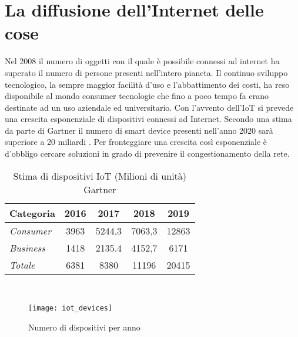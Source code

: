 \section{La diffusione dell'Internet delle cose}
Nel 2008 il numero di oggetti con il quale è possibile
connessi ad internet ha superato il numero di persone presenti nell'intero
pianeta. Il continuo sviluppo tecnologico, la sempre maggior facilità d'uso e
l'abbattimento dei costi, ha reso disponibile al mondo consumer tecnologie che
fino a poco tempo fa erano destinate ad un uso aziendale ed universitario. 
Con l'avvento dell'IoT si prevede una crescita esponenziale di dispositivi connessi
ad Internet. Secondo  una stima da parte di Gartner il numero di smart
device presenti nell'anno 2020 sarà superiore a 20 miliardi \cite{gartner2016}.
Per fronteggiare una crescita così esponenziale è d'obbligo cercare soluzioni
in grado di prevenire il congestionamento della rete. 
\\
\begin{table}[ht]
        \centering
        \begin{tabular}{l|c|c|c|c}
                \textbf{Categoria}  & 2016 & 2017 & 2018 & 2019 \\
                \hline
                \emph{Consumer}  & 3963 & 5244,3 & 7063,3 & 12863 \\
                \emph{Business}  & 1418 & 2135.4 & 4152,7 & 6171  \\
                \emph{Totale }   & 6381 & 8380   & 11196  & 20415 \\
        \end{tabular}
        \caption{Stima di dispositivi IoT (Milioni di unità)
        Gartner\cite{gartner2016}}
\end{table}
\\
\begin{figure}[ht]
        \centering 
                \texttt{[image: iot\_devices]}
        \caption{Numero di dispositivi per anno}
\end{figure}

